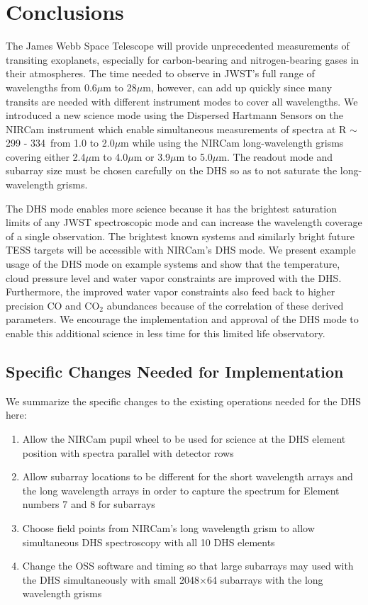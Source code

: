 \documentclass[iop]{emulateapj}
\newcommand{\DHSres}{299 - 334}
\begin{document}
\section{Conclusions}

The James Webb Space Telescope will provide unprecedented measurements of transiting exoplanets, especially for carbon-bearing and nitrogen-bearing gases in their atmospheres.
The time needed to observe in JWST's full range of wavelengths from 0.6$\mu$m to 28$\mu$m, however, can add up quickly since many transits are needed with different instrument modes to cover all wavelengths.
We introduced a new science mode using the Dispersed Hartmann Sensors on the NIRCam instrument which enable simultaneous measurements of spectra at R $\sim$ \DHSres\ from 1.0 to 2.0$\mu$m while using the NIRCam long-wavelength grisms covering either 2.4$\mu$m to 4.0$\mu$m or 3.9$\mu$m to 5.0$\mu$m.
The readout mode and subarray size must be chosen carefully on the DHS so as to not saturate the long-wavelength grisms.

The DHS mode enables more science because it has the brightest saturation limits of any JWST spectroscopic mode and can increase the wavelength coverage of a single observation.
The brightest known systems and similarly bright future TESS targets will be accessible with NIRCam's DHS mode.
We present example usage of the DHS mode on example systems and show that the temperature, cloud pressure level and water vapor constraints are improved with the DHS.
Furthermore, the improved water vapor constraints also feed back to higher precision CO and CO$_2$ abundances because of the correlation of these derived parameters.
We encourage the implementation and approval of the DHS mode to enable this additional science in less time for this limited life observatory.

\subsection{Specific Changes Needed for Implementation}
We summarize the specific changes to the existing operations needed for the DHS here:
\begin{enumerate}
\item Allow the NIRCam pupil wheel to be used for science at the DHS element position with spectra parallel with detector rows
\item Allow subarray locations to be different for the short wavelength arrays and the long wavelength arrays in order to capture the spectrum for Element numbers 7 and 8 for subarrays
\item Choose field points from NIRCam's long wavelength grism to allow simultaneous DHS spectroscopy with all 10 DHS elements
\item Change the OSS software and timing so that large subarrays may used with the DHS simultaneously with small 2048$\times$64 subarrays with the long wavelength grisms
\end{enumerate}
\end{document}
